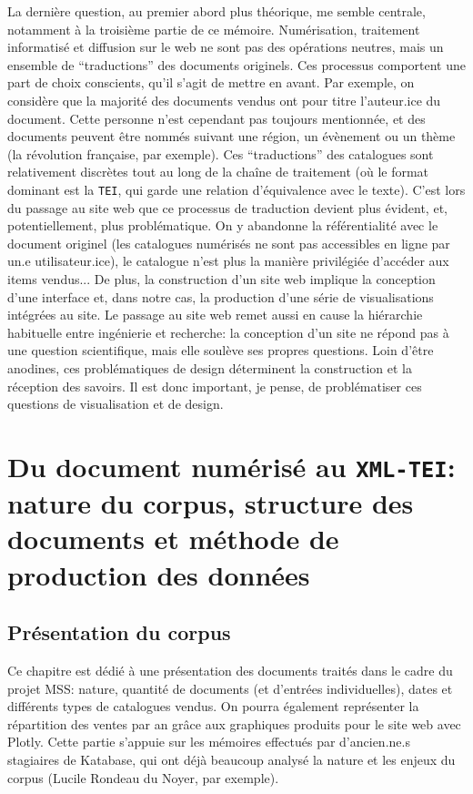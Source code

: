\documentclass[a4paper, 12pt, twoside]{book}
\newcommand{\tei}{\texttt{TEI}}
\newcommand{\xmltei}{\texttt{XML-TEI}}
\begin{document}
La dernière question, au premier abord plus théorique, me semble centrale, notamment à la troisième partie de ce mémoire. Numérisation, traitement informatisé et diffusion sur le web ne sont pas des opérations neutres, mais un ensemble de \enquote{traductions} des documents originels. Ces processus comportent une part de choix conscients, qu'il s'agit de mettre en avant. Par exemple, on considère que la majorité des documents vendus ont pour titre l'auteur.ice du document. Cette personne n'est cependant pas toujours mentionnée, et des documents peuvent être nommés suivant une région, un évènement ou un thème (la révolution française, par exemple). Ces \enquote{traductions} des catalogues sont relativement discrètes tout au long de la chaîne de traitement (où le format dominant est la \tei{}, qui garde une relation d'équivalence avec le texte). C'est lors du  passage au site web que ce processus de traduction devient plus évident, et, potentiellement, plus problématique. On y abandonne la référentialité avec le document originel (les catalogues numérisés ne sont pas accessibles en ligne par un.e utilisateur.ice), le catalogue n'est plus la manière privilégiée d'accéder aux items vendus... De plus, la construction d'un site web implique la conception d'une interface et, dans notre cas, la production d'une série de visualisations intégrées au site. Le passage au site web remet aussi en cause la hiérarchie habituelle entre ingénierie et recherche: la conception d'un site ne répond pas à une question scientifique, mais elle soulève ses propres questions. Loin d'être anodines, ces problématiques de design déterminent la construction et la réception des savoirs. Il est donc important, je pense, de problématiser ces questions de visualisation et de design.




\part{Du document numérisé au \xmltei: nature du corpus, structure des documents et méthode de production des données}
\chapter{Présentation du corpus}
Ce chapitre est dédié à une présentation des documents traités dans le cadre du projet MSS: nature, quantité de documents (et d'entrées individuelles), dates et différents types de catalogues vendus. On pourra également représenter la répartition des ventes par an grâce aux graphiques produits pour le site web avec Plotly. Cette partie s'appuie sur les mémoires effectués par d'ancien.ne.s stagiaires de Katabase, qui ont déjà beaucoup analysé la nature et les enjeux du corpus (Lucile Rondeau du Noyer, par exemple).
\end{document}
